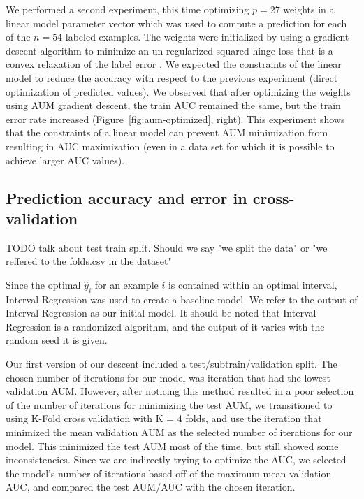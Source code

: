 \documentclass{article}
\begin{document}
We performed a second experiment, this time optimizing  $p=27$ weights in a linear model parameter vector which was used to compute a prediction for each of the $n=54$ labeled examples.
The weights were initialized by using a gradient descent algorithm to minimize an un-regularized squared hinge loss that is a convex relaxation of the label error \citep{Hocking2013icml}.
We expected the constraints of the linear model to reduce the accuracy with respect to the previous experiment (direct optimization of predicted values).
We observed that after optimizing the weights using AUM gradient descent, the train AUC remained the same, but the train error rate increased (Figure~\ref{fig:aum-optimized}, right).
This experiment shows that the constraints of a linear model can prevent AUM minimization from resulting in AUC maximization (even in a data set for which it is possible to achieve larger AUC values).

\subsection{Prediction accuracy and error in cross-validation}

TODO talk about test train split.
Should we say "we split the data" or "we reffered to the folds.csv in the dataset"

Since the optimal $\hat y_i$ for an example $i$ is contained within an optimal interval, Interval Regression was used to create a baseline model. We refer to the output of Interval Regression as our initial model.
It should be noted that Interval Regression is a randomized algorithm, and the output of it varies with the random seed it is given.

Our first version of our descent included a test/subtrain/validation split.
The chosen number of iterations for our model was iteration that had the lowest validation AUM.
However, after noticing this method resulted in a poor selection of the number of iterations for minimizing the test AUM, we transitioned to using K-Fold cross validation with K = 4 folds, and use the iteration that minimized the mean validation AUM as the selected number of iterations for our model.
This minimized the test AUM most of the time, but still showed some inconsistencies.
Since we are indirectly trying to optimize the AUC, we selected the model's number of iterations based off of the maximum mean validation AUC, and compared the test AUM/AUC with the chosen iteration.
\end{document}
